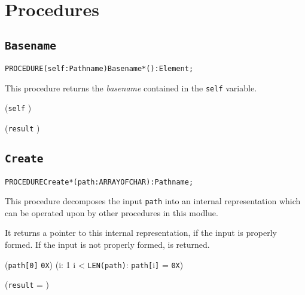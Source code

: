 \section{Procedures}
\subsection{\texttt{Basename}}\label{pathnames:basename}
\begin{alltt}
  PROCEDURE (self : Pathname) Basename*() : Element;
\end{alltt}

\begin{semantics}
This procedure returns the \emph{basename} contained in the
\texttt{self} variable.
\end{semantics}

\begin{precondition}
(\texttt{self} \neq \nil) \logicaland {}
\end{precondition}

\begin{postcondition}
(\texttt{result} \neq \nil) \logicaland {}
\end{postcondition}


\subsection{\texttt{Create}}\label{pathnames:create}
\begin{alltt}
  PROCEDURE Create*(path : ARRAY OF CHAR) : Pathname;
\end{alltt}

\begin{semantics}
This procedure decomposes the input \texttt{path} into an internal
representation which can be operated upon by other procedures in this
modlue.

It returns a pointer to this internal representation, if the input is
properly formed.  If the input is not properly formed, \nil is
returned.
\end{semantics}

\begin{precondition}
  (\texttt{path[0]} \neq \texttt{0X}) \logicaland
  (\exists i: 1 \leq i < \texttt{LEN(path)}:
  \texttt{path[}i\texttt{]} = \texttt{0X})
\end{precondition}

\begin{postcondition}
(\texttt{result} = \nil) \logicalor {}
\end{postcondition}

